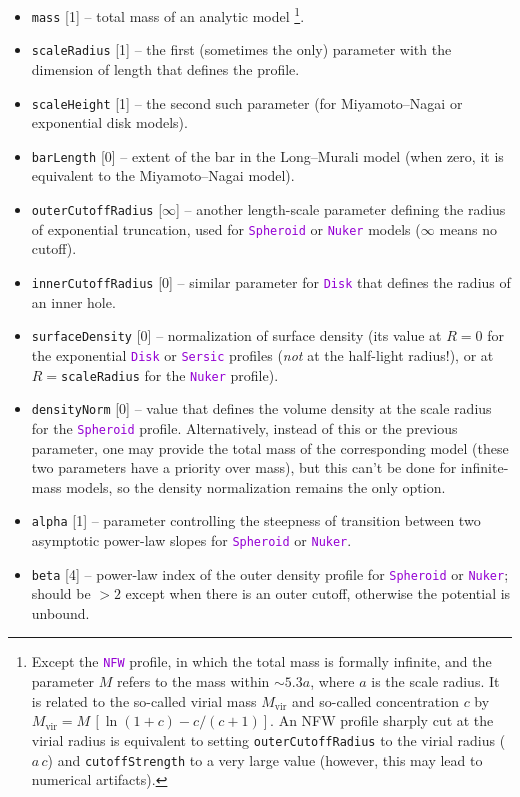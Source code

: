 \documentclass[12pt]{article}
\newcommand{\ttt}[1]{\textcolor{darkviolet}{\texttt{#1}}}
\newcommand{\ppp}[1]{\textcolor{darkolive} {\texttt{#1}}}
\begin{document}
\begin{itemize}
\item \ppp{mass} [1] -- total mass of an analytic model%
\footnote{Except the \ttt{NFW} profile, in which the total mass is formally infinite, and the parameter $M$ refers to the mass within $\sim 5.3a$, where $a$ is the scale radius. It is related to the so-called virial mass $M_\mathrm{vir}$ and so-called concentration $c$ by $M_\mathrm{vir}=M\,[\ln(1+c)-c/(c+1)]$. An NFW profile sharply cut at the virial radius is equivalent to setting \ppp{outerCutoffRadius} to the virial radius ($a\,c$) and \ppp{cutoffStrength} to a very large value (however, this may lead to numerical artifacts).}.
\item \ppp{scaleRadius} [1] -- the first (sometimes the only) parameter with the dimension of length that defines the profile.
\item \ppp{scaleHeight} [1] -- the second such parameter (for Miyamoto--Nagai or exponential disk models).
\item \ppp{barLength} [0] -- extent of the bar in the Long--Murali model (when zero, it is equivalent to the Miyamoto--Nagai model).
\item \ppp{outerCutoffRadius} [$\infty$] -- another length-scale parameter defining the radius of exponential truncation, used for \ttt{Spheroid} or \ttt{Nuker} models ($\infty$ means no cutoff).
\item \ppp{innerCutoffRadius} [0] -- similar parameter for \ttt{Disk} that defines the radius of an inner hole.
\item \ppp{surfaceDensity} [0] -- normalization of surface density (its value at $R=0$ for the exponential \ttt{Disk} or \ttt{Sersic} profiles (\textit{not} at the half-light radius!), or at $R=$\ppp{scaleRadius} for the \ttt{Nuker} profile).
\item \ppp{densityNorm} [0] -- value that defines the volume density at the scale radius for the \ttt{Spheroid} profile. Alternatively, instead of this or the previous parameter, one may provide the total mass of the corresponding model (these two parameters have a priority over mass), but this can't be done for infinite-mass models, so the density normalization remains the only option.
\item \ppp{alpha} [1] -- parameter controlling the steepness of transition between two asymptotic power-law slopes for \ttt{Spheroid} or \ttt{Nuker}.
\item \ppp{beta} [4] -- power-law index of the outer density profile for \ttt{Spheroid} or \ttt{Nuker}; should be $>2$ except when there is an outer cutoff, otherwise the potential is unbound.

\end{itemize}
\end{document}
